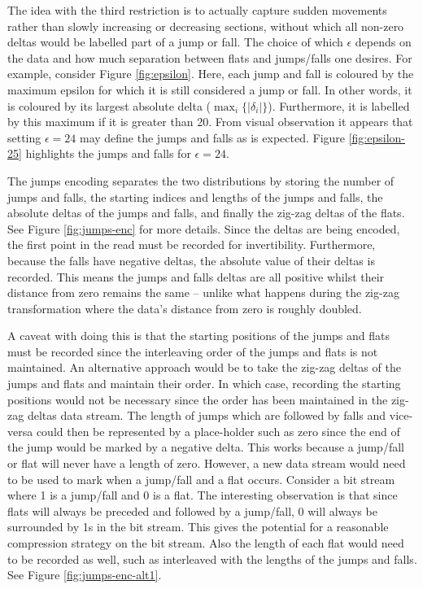 The idea with the third restriction is to actually capture sudden movements
rather than slowly increasing or decreasing sections, without which all non-zero
deltas would be labelled part of a jump or fall. The choice of which $\epsilon$
depends on the data and how much separation between flats and jumps/falls one
desires. For example, consider Figure \ref{fig:epsilon}. Here, each jump and fall
is coloured by the maximum epsilon for which it is still considered a jump or
fall. In other words, it is coloured by its largest absolute delta
($\max_i\{|\delta_i|\}$). Furthermore, it is labelled by this maximum if it is
greater than 20. From visual observation it appears that setting $\epsilon=24$
may define the jumps and falls as is expected. Figure \ref{fig:epsilon-25}
highlights the jumps and falls for $\epsilon=24$.




The jumps encoding separates the two distributions by storing the number of
jumps and falls, the starting indices and lengths of the jumps and falls, the
absolute deltas of the jumps and falls, and finally the zig-zag deltas of the
flats. See Figure \ref{fig:jumps-enc} for more details. Since the deltas are
being encoded, the first point in the read must be recorded for invertibility.
Furthermore, because the falls have negative deltas, the absolute value of their
deltas is recorded. This means the jumps and falls deltas are all positive
whilst their distance from zero remains the same -- unlike what happens during
the zig-zag transformation where the data's distance from zero is roughly
doubled.



A caveat with doing this is that the starting positions of the jumps and flats
must be recorded since the interleaving order of the jumps and flats is not
maintained. An alternative approach would be to take the zig-zag deltas of the
jumps and flats and maintain their order. In which case, recording the starting
positions would not be necessary since the order has been maintained in the
zig-zag deltas data stream. The length of jumps which are followed by falls and
vice-versa could then be represented by a place-holder such as zero since the
end of the jump would be marked by a negative delta. This works because a
jump/fall or flat will never have a length of zero. However, a new data stream
would need to be used to mark when a jump/fall and a flat occurs. Consider a bit
stream where 1 is a jump/fall and 0 is a flat. The interesting observation is
that since flats will always be preceded and followed by a jump/fall, 0 will
always be surrounded by 1s in the bit stream. This gives the potential for
a reasonable compression strategy on the bit stream. Also the length of each
flat would need to be recorded as well, such as interleaved with the lengths of
the jumps and falls. See Figure \ref{fig:jumps-enc-alt1}.

